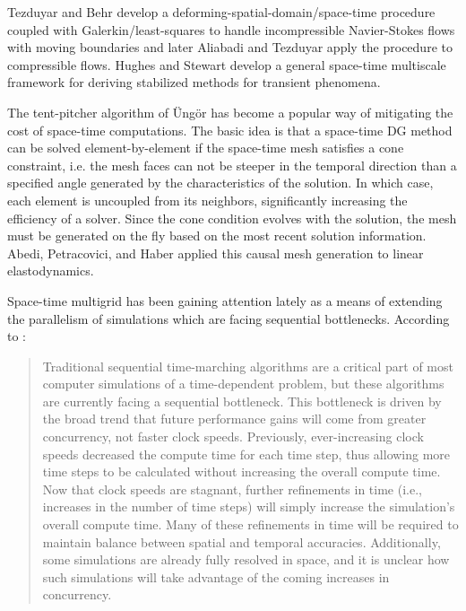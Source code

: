 \documentclass[Dissertation.tex]{subfiles}
\begin{document}
Tezduyar and Behr\cite{Tezduyar1992} develop a deforming-spatial-domain/space-time procedure coupled with Galerkin/least-squares
to handle incompressible Navier-Stokes flows
with moving boundaries and later Aliabadi and Tezduyar\cite{Aliabadi1993} apply the procedure to compressible flows.
Hughes and Stewart\cite{HughesSpaceTime} develop a general space-time multiscale framework for deriving stabilized methods for
transient phenomena.

The tent-pitcher algorithm of {\"U}ng{\"o}r\cite{TentPitcher} has become a popular way of mitigating the cost of space-time computations.
The basic idea is that a space-time DG method can be solved element-by-element if the space-time mesh satisfies a cone constraint, i.e.
the mesh faces can not be steeper in the temporal direction than a specified angle generated by the characteristics of the solution.
In which case, each element is uncoupled from its neighbors, significantly increasing the efficiency of a solver.
Since the cone condition evolves with the solution, the mesh must be generated on the fly based on the most recent solution information.
Abedi, Petracovici, and Haber\cite{Abedi2006} applied this causal mesh generation to linear elastodynamics.


Space-time multigrid has been gaining attention lately as a means of extending the parallelism of simulations which 
are facing sequential bottlenecks.
According to \cite{XBraid,XBraidPaper}:
\begin{quotation}
Traditional sequential time-marching algorithms are a critical part of most computer simulations of a time-dependent problem, but these algorithms are currently facing a sequential bottleneck. This bottleneck is driven by the broad trend that future performance gains will come from greater concurrency, not faster clock speeds. Previously, ever-increasing clock speeds decreased the compute time for each time step, thus allowing more time steps to be calculated without increasing the overall compute time. Now that clock speeds are stagnant, further refinements in time (i.e., increases in the number of time steps) will simply increase the simulation’s overall compute time. Many of these refinements in time will be required to maintain balance between spatial and temporal accuracies. Additionally, some simulations are already fully resolved in space, and it is unclear how such simulations will take advantage of the coming increases in concurrency.
\end{quotation}
\end{document}
